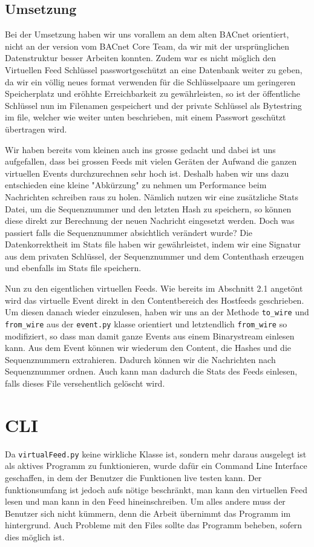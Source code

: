 \documentclass[a4paper,titlepage]{article}
\newcommand{\ilc}[1]{\textcolor{codeColor}{\texttt{#1}}}
\begin{document}
\subsection{Umsetzung}
Bei der Umsetzung haben wir uns vorallem an dem alten BACnet orientiert, nicht an der version vom BACnet Core Team, da wir mit der ursprünglichen Datenstruktur besser Arbeiten konnten. Zudem war es nicht möglich den Virtuellen Feed Schlüssel passwortgeschützt an eine Datenbank weiter zu geben, da wir ein völlig neues format verwenden für die Schlüsselpaare um geringeren Speicherplatz und eröhhte Erreichbarkeit zu gewährleisten, so ist der öffentliche Schlüssel nun im Filenamen gespeichert und der private Schlüssel als Bytestring im file, welcher wie weiter unten beschrieben, mit einem Passwort geschützt übertragen wird.

Wir haben bereits vom kleinen auch ins grosse gedacht und dabei ist uns aufgefallen, dass bei grossen Feeds mit vielen Geräten der Aufwand die ganzen virtuellen Events durchzurechnen sehr hoch ist. Deshalb haben wir uns dazu entschieden eine kleine "Abkürzung" zu nehmen um Performance beim Nachrichten schreiben raus zu holen. Nämlich nutzen wir eine zusätzliche Stats Datei, um die  Sequenznummer und den letzten Hash zu speichern, so können diese direkt zur Berechnung der neuen Nachricht eingesetzt werden. Doch was passiert falls die Sequenznummer absichtlich verändert wurde? Die Datenkorrektheit im Stats file haben wir gewährleistet, indem wir eine Signatur aus dem privaten Schlüssel, der Sequenznummer und dem Contenthash erzeugen und ebenfalls im Stats file speichern.

Nun zu den eigentlichen virtuellen Feeds. Wie bereits im Abschnitt 2.1 angetönt wird das virtuelle Event direkt in den Contentbereich des Hostfeeds geschrieben. Um diesen danach wieder einzulesen, haben wir uns an der Methode \ilc{to\_wire} und \ilc{from\_wire} aus der \ilc{event.py} klasse orientiert und letztendlich \ilc{from\_wire} so modifiziert, so dass man damit ganze Events aus einem Binarystream einlesen kann. 
Aus dem Event können wir wiederum den Content, die Hashes und die Sequenznummern extrahieren. Dadurch können wir die Nachrichten nach Sequenznummer ordnen. Auch kann man dadurch die Stats des Feeds einlesen, falls dieses File versehentlich gelöscht wird.

\section{CLI}
Da \ilc{virtualFeed.py}  keine wirkliche Klasse ist, sondern mehr daraus ausgelegt ist als aktives Programm zu funktionieren, wurde dafür ein Command Line Interface geschaffen, in dem der Benutzer die  Funktionen live testen kann. Der funktionsumfang ist jedoch aufs nötige beschränkt, man kann den virtuellen Feed lesen und man kann in den Feed hineinschreiben. Um alles andere muss der Benutzer sich nicht kümmern, denn die Arbeit übernimmt das Programm im hintergrund. Auch Probleme mit den Files sollte das Programm beheben, sofern dies möglich ist.
\end{document}
